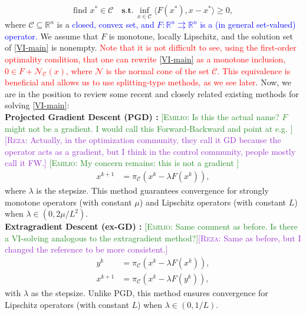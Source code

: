 \documentclass[letterpaper, 10 pt, conference]{ieeeconf}  %
\newcommand{\edit}[1]{\textcolor{blue}{#1}}
\newcommand{\emiliosay}[1]{\textcolor{ForestGreen}{[\textsc{Emilio:} #1]}}
\newcommand{\rezasay}[1]{\textcolor{DarkOrchid}{[\textsc{Reza:} #1]}}
\newcommand{\R}{\mathbb{R}}
\newcommand{\red}[1]{\textcolor{red}{#1}}
\begin{document}
\begin{equation}\label{VI-main}
\text{find} \,\, x^* \in \mathcal{C} \quad \textbf{s.t.} \, \inf\limits_{x\in \mathcal{C}}\langle F(x^*), x - x^* \rangle \geq 0,
\end{equation}
where $\mathcal{C}\subseteq\R^n$ is a \edit{closed, convex set, and $F:\R^n\rightrightarrows \R^n$ is a (in general set-valued) operator.} We assume that $F$ is monotone, locally Lipschitz, and the solution set of \eqref{VI-main} is nonempty. \red{Note that it is not difficult to see, using the first-order optimality condition, that one can rewrite \eqref{VI-main} as a monotone inclusion, $0 \in F + \mathcal{N}_{\mathcal{C}}(x)$, where $\mathcal{N}$ is the normal cone of the set \(\mathcal{C}\). This equivalence is beneficial and allows us to use splitting-type methods, as we see later}. Now, we are in the position to review some recent and closely related existing methods for solving \eqref{VI-main}:\\
\textbf{Projected Gradient Descent (PGD) \cite{nemirovskij1983problem}:}  
\emiliosay{Is this the actual name? $F$ might not be a gradient. I would call this Forward-Backward and point at e.g. \cite[\S 12.5.1]{facchinei2003finite}}\rezasay{Actually, in the optimization community, they call it GD because the operator acts as a gradient, but I think in the control community, people mostly call it FW.} \emiliosay{My concern remains: this is not a gradient }
\begin{align*}
    x^{k+1} &= \pi_{\mathcal{C}}(x^k - \lambda F(x^k)),
\end{align*}
where \(\lambda\) is the stepsize. This method guarantees convergence for strongly monotone operators (with constant \(\mu\)) and Lipschitz operators (with constant \(L\)) when \(\lambda \in (0, 2\mu/L^2)\).\\
\textbf{Extragradient Descent (ex-GD) \cite{malitsky2014extragradient}:} \emiliosay{Same comment as before. Is there a VI-solving analogous to the extragradient method?}\rezasay{Same as before, but I changed the reference to be more consistent.} 
\begin{align*}
    y^k &= \pi_{\mathcal{C}}(x^k - \lambda F(x^k)), \\
    x^{k+1} &= \pi_{\mathcal{C}}(x^k - \lambda F(y^k)),
\end{align*}
with \(\lambda\) as the stepsize. Unlike PGD, this method ensures convergence for Lipschitz operators (with constant \(L\)) when \(\lambda \in (0, 1/L)\). \\
\end{document}

